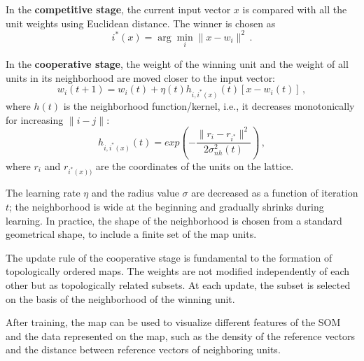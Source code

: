 In the \textbf{competitive stage}, the current input vector $x$ is compared with all the unit weights using Euclidean distance. The winner is chosen as
\begin{equation*}
    i^*(x) = \arg \min_i \|x - w_i\|^2 \,.
\end{equation*}

In the \textbf{cooperative stage}, the weight of the winning unit and the weight of all units in its neighborhood are moved closer to the input vector:
\begin{equation*}
    w_i(t+1) = w_i(t) + \eta (t) h_{i,i^*(x)}(t)[x - w_i(t)] \,,
\end{equation*}
where $h(t)$ is the neighborhood function/kernel, i.e., it decreases monotonically for increasing $\|i-j\|$:
\begin{equation*}
    h_{i,i^*(x)}(t) = exp(-\dfrac{\|r_i - r_{i^*}\|^2}{2 \sigma_{nh}^2 (t)}) \,,
\end{equation*}
where $r_i$ and $r_{i^*(x))}$ are the coordinates of the units on the lattice.

The learning rate $\eta$ and the radius value $\sigma$ are decreased as a function of iteration $t$; the neighborhood is wide at the beginning and gradually shrinks during learning. In practice, the shape of the neighborhood is chosen from a standard geometrical shape, to include a finite set of the map units.

The update rule of the cooperative stage is fundamental to the formation of topologically ordered maps. The weights are not modified independently of each other but as topologically related subsets. At each update, the subset is selected on the basis of the neighborhood of the winning unit.

After training, the map can be used to visualize different features of the SOM and the data represented on the map, such as the density of the reference vectors and the distance between reference vectors of neighboring units.